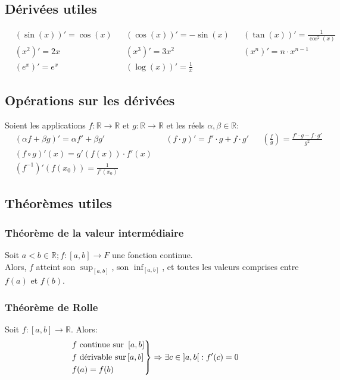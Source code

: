 \documentclass{article}
\begin{document}
\subsection{Dérivées utiles}
\begin{align*}
	&(\sin(x))' = \cos(x)
		& &(\cos(x))' = -\sin(x)
			& &(\tan(x))' = \frac{1}{\cos^2(x)} \\
	&(x^2)' = 2x
		& &(x^3)' = 3x^2
			& &(x^n)' = n \cdot x^{n-1} \\
	&(e^x)' = e^x
		& &(\log(x))' = \frac{1}{x}
\end{align*}

\subsection{Opérations sur les dérivées}
Soient les applications \(f: \mathbb{R} \to \mathbb{R}\) et \(g: \mathbb{R} \to \mathbb{R}\) et les réels \(\alpha, \beta \in \mathbb{R}\):
\begin{align*}
	&(\alpha f + \beta g)' = \alpha f' + \beta g' 
		& &(f \cdot g)' = f' \cdot g + f \cdot g' 
			& &\left (\frac{f}{g}\right ) = \frac{f' \cdot g - f \cdot g'}{g^2} \\ 
	&(f \circ g)'(x) = g'(f(x)) \cdot f'(x) \\
	&(f^{-1})' (f(x_0))  = \frac{1}{f'(x_0)} %
\end{align*}

\subsection{Théorèmes utiles} %

\subsubsection{Théorème de la valeur intermédiaire}
Soit \(a < b \in \mathbb{R}; f : \left [a, b \right ] \to F\) une fonction continue. \\
Alors, \(f\) atteint son \(\sup_{\left [a, b \right ]}\), son \(\inf_{\left [a, b \right ]}\), et toutes les valeurs comprises entre \(f(a)\) et \(f(b)\).

\subsubsection{Théorème de Rolle}
Soit \(f : \left [a, b \right ] \to \mathbb{R}\). Alors:
\begin{equation*}
	\begin{rcases}
		f \text{ continue sur } \left [a, b \right ] \\
		f \text{ dérivable sur} \left [a, b \right ] \\
		f(a) = f(b)
	\end{rcases}
	\Rightarrow \exists c \in \left ]a, b \right [ : f'(c) = 0
\end{equation*}
\end{document}
